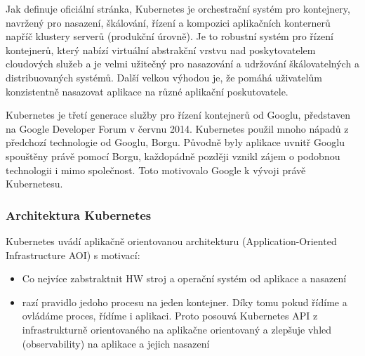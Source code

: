 \documentclass[thesis=M,czech]{FITthesis}[2019/12/23]
\theoremstyle{plain}
\theoremstyle{definition}
\begin{document}
Jak definuje oficiální stránka, Kubernetes je orchestrační systém pro kontejnery, navržený pro nasazení, škálování, řízení a kompozici aplikačních konternerů napříč klustery serverů (produkční úrovně). Je to robustní systém pro řízení  kontejnerů, který nabízí virtuální abstrakční vrstvu nad poskytovatelem cloudových služeb a je velmi užitečný pro nasazování a udržování škálovatelných a distribuovaných systémů. Další velkou výhodou je, že pomáhá uživatelům konzistentně nasazovat aplikace na různé aplikační poskutovatele.

Kubernetes je třetí generace služby pro řízení kontejnerů od Googlu, představen na Google Developer Forum v červnu 2014. Kubernetes použil mnoho nápadů z předchozí technologie od Googlu, Borgu. Původně byly aplikace uvnitř Googlu spouštěny právě pomocí Borgu, každopádně později vznikl zájem o podobnou technologii i mimo společnost. Toto motivovalo Google k vývoji právě Kubernetesu.  

\subsubsection{Architektura Kubernetes}




Kubernetes uvádí aplikačně orientovanou architekturu (Application-Oriented Infrastructure AOI)\cite{as-k8s-san-kho-lin}
s motivací:


\begin{itemize}  
	
	
	

\item  Co nejvíce zabstraktnit HW stroj a operační systém od aplikace a nasazení 
\item  razí pravidlo jedoho procesu na jeden kontejner. Díky tomu pokud řídíme a ovládáme proces, řídíme i aplikaci. Proto posouvá Kubernetes API z infrastrukturně orientovaného na aplikačne orientovaný a zlepšuje vhled (observability) na aplikace a jejich nasazení


\end{itemize}
\end{document}
